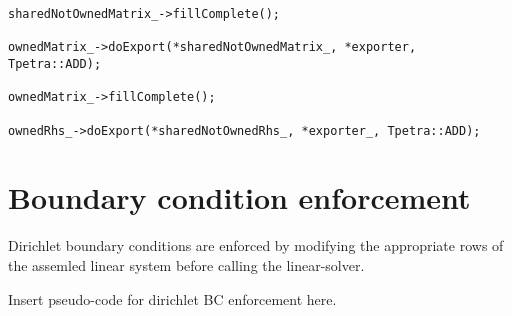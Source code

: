 \begin{verbatim}
sharedNotOwnedMatrix_->fillComplete();

ownedMatrix_->doExport(*sharedNotOwnedMatrix_, *exporter, Tpetra::ADD);

ownedMatrix_->fillComplete();

ownedRhs_->doExport(*sharedNotOwnedRhs_, *exporter_, Tpetra::ADD);
\end{verbatim}

\section{Boundary condition enforcement}

Dirichlet boundary conditions are enforced by modifying the appropriate rows
of the assemled linear system before calling the linear-solver.

Insert pseudo-code for dirichlet BC enforcement here.


